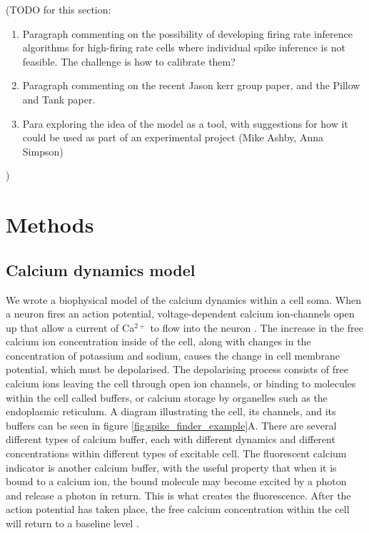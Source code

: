 \documentclass[a4paper,12pt]{article}
\theoremstyle{definition}
\begin{document}
(TODO for this section:
\begin{enumerate}
    \item Paragraph commenting on the possibility of developing firing rate inference algorithms for high-firing rate cells where individual spike inference is not feasible. The challenge is how to calibrate them?
    \item Paragraph commenting on the recent Jason kerr group paper, and the Pillow and Tank paper.
    \item Para exploring the idea of the model as a tool, with suggestions for how it could be used as part of an experimental project (Mike Ashby, Anna Simpson)
\end{enumerate})

\section{Methods}
\subsection{Calcium dynamics model}
We wrote a biophysical model of the calcium dynamics within a cell soma. When a neuron fires an action potential, voltage-dependent calcium ion-channels open up that allow a current of Ca$^{2+}$ to flow into the neuron \cite{koch}. The increase in the free calcium ion concentration inside of the cell, along with changes in the concentration of potassium and sodium, causes the change in cell membrane potential, which must be depolarised. The depolarising process consists of free calcium ions leaving the cell through open ion channels, or binding to molecules within the cell called buffers, or calcium storage by organelles such as the endoplasmic reticulum. A diagram illustrating the cell, its channels, and its buffers can be seen in figure \ref{fig:spike_finder_example}A. There are several different types of calcium buffer, each with different dynamics and different concentrations within different types of excitable cell. The fluorescent calcium indicator is another calcium buffer, with the useful property that when it is bound to a calcium ion, the bound molecule may become excited by a photon and release a photon in return. This is what creates the fluorescence. After the action potential has taken place, the free calcium concentration within the cell will return to a baseline level \cite{maravall}.
\end{document}
